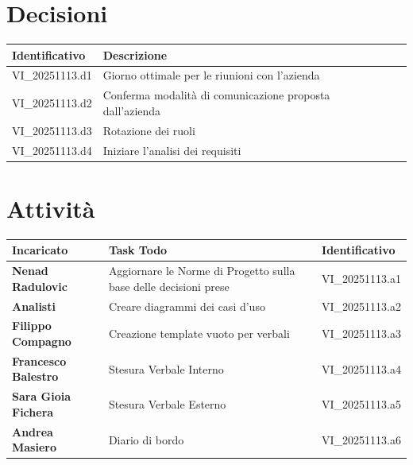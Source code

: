 \documentclass[a4paper,12pt]{article}
\begin{document}
    \section{Decisioni} {
        \begin{tabularx}{\textwidth}{|l|X|l|}
            \hline
            \textbf{Identificativo} & \textbf{Descrizione}\\
            \hline
            VI\_20251113.d1 & Giorno ottimale per le riunioni con l'azienda\\
            \hline
            VI\_20251113.d2 & Conferma modalità di comunicazione proposta dall'azienda\\
            \hline
            VI\_20251113.d3 & Rotazione dei ruoli\\
            \hline
            VI\_20251113.d4 & Iniziare l'analisi dei requisiti\\
            \hline
        \end{tabularx}
    }

    \section{Attività} {
        \begin{tabularx}{\textwidth}{|l|X|l|}
            \hline
            \textbf{Incaricato} & \textbf{Task Todo} & \textbf{Identificativo} \\
            \hline
            \textbf{Nenad Radulovic} & Aggiornare le Norme di Progetto sulla base delle decisioni prese & VI\_20251113.a1\\
            \hline
            \textbf{Analisti} & Creare diagrammi dei casi d'uso & VI\_20251113.a2\\
            \hline
            \textbf{Filippo Compagno} & Creazione template vuoto per verbali & VI\_20251113.a3\\
            \hline
            \textbf{Francesco Balestro} & Stesura Verbale Interno & VI\_20251113.a4\\
            \hline
            \textbf{Sara Gioia Fichera} & Stesura Verbale Esterno & VI\_20251113.a5\\
            \hline
            \textbf{Andrea Masiero} & Diario di bordo & VI\_20251113.a6\\
            \hline
        \end{tabularx}
    }
\end{document}
